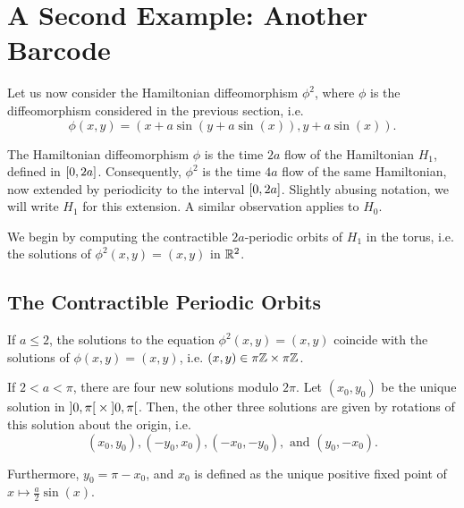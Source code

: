 \chapter{A Second Example: Another Barcode}

Let us now consider the Hamiltonian diffeomorphism $\phi^2$, where $\phi$ is the diffeomorphism considered in the previous section, i.e.
\begin{equation}
\phi(x,y) = ( x + a \sin(y + a \sin(x)), y + a \sin(x)).
\end{equation}

The Hamiltonian diffeomorphism $\phi$ is the time $2a$ flow of the Hamiltonian $H_1$, defined in $\interval 0 {2a}$. Consequently, $\phi^2$ is the time $4a$ flow of the same Hamiltonian, now extended by periodicity to the interval $\interval 0 {2a}$. Slightly abusing notation, we will write $H_1$ for this extension. A similar observation applies to $H_0$.

We begin by computing the contractible $2a$-periodic orbits of $H_1$ in the torus, i.e. the solutions of $\phi^2(x,y) = (x,y)$ in $\mathbb{R}^2$.

\section{The Contractible Periodic Orbits}

\begin{prop}\label{prop:orbitsphi2}
If $a \leq 2$, the solutions to the equation $\phi^2(x,y) = (x,y)$ coincide with the solutions of $\phi(x,y) = (x,y)$, i.e. $(x,y) \in \pi \mathbb{Z} \times \pi \mathbb{Z}$.

If $2 < a < \pi$, there are four new solutions modulo $2\pi$. Let $(x_0, y_0)$ be the unique solution in $\ointerval 0 \pi \times \ointerval 0 \pi$. Then, the other three solutions are given by rotations of this solution about the origin, i.e.
\begin{equation}
(x_0, y_0), (-y_0, x_0), (-x_0, -y_0), \text{ and } (y_0, -x_0).
\end{equation}

Furthermore, $y_0 = \pi - x_0$, and $x_0$ is defined as the unique positive fixed point of $x \mapsto \frac a 2 \sin(x)$.
\end{prop}

